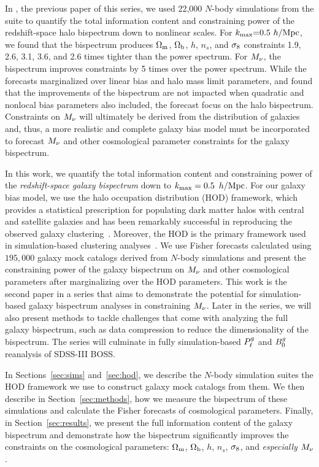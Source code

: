 In \cite{hahn2020}, the previous paper of this series, we used 22,000 $N$-body
simulations from the \quij suite to quantify the total information content and
constraining power of the redshift-space halo bispectrum down to nonlinear scales. 
For $k_{\rm max}{=}0.5~h/{\rm Mpc}$, we found that the bispectrum produces $\Omega_{\rm m}$,
$\Omega_{\rm b}$, $h$, $n_s$, and $\sigma_8$ constraints 1.9, 2.6, 3.1, 3.6, and 2.6 times
tighter than the power spectrum. For $M_\nu$, the bispectrum improves
constraints by 5 times over the power spectrum. While the forecasts marginalized 
over linear bias and halo mass limit parameters, and found that the
improvements of the bispectrum are not impacted when quadratic and nonlocal
bias parameters also included, the \cite{hahn2020} forecast focus on the halo
bispectrum. Constraints on $M_\nu$ will ultimately be derived from the distribution 
of galaxies and, thus, a more realistic and complete galaxy bias model must be
incorporated to forecast $M_\nu$ and other cosmological parameter constraints 
for the galaxy bispectrum.

In this work, we quantify the total information content and constraining power
of the {\em redshift-space galaxy bispectrum} down to $k_{\rm max}= 0.5~\,h/\mathrm{Mpc}$. For our galaxy
bias model, we use the halo occupation distribution (HOD) framework, which provides a
statistical prescription for populating dark matter halos with central and satellite
galaxies and has been remarkably successful in reproducing the observed galaxy
clustering~\citep[\emph{e.g.}][]{zheng2005, leauthaud2012, tinker2013, zentner2016, vakili2019}. 
Moreover, the HOD is the primary framework used in simulation-based clustering
analyses~\citep[\eg][]{mcclintock2018, zhai2019, lange2019, wibking2019}. 
We use Fisher forecasts calculated using $195,000$ galaxy mock catalogs derived
from $N$-body simulations and present the constraining power of the galaxy
bispectrum on $M_\nu$ and other cosmological parameters after marginalizing 
over the HOD parameters. This work is the second paper in a series that aims 
to demonstrate the potential for simulation-based galaxy bispectrum analyses 
in constraining $M_\nu$. Later in the series, we will also present methods to
tackle challenges that come with analyzing the full galaxy bispectrum, such 
as data compression to reduce the dimensionality of the bispectrum. The series 
will culminate in fully simulation-based $P^g_{\ell}$ and $B^g_0$ reanalysis of SDSS-III BOSS. 

In Sections~\ref{sec:sims} and~\ref{sec:hod}, we describe the \quij $N$-body simulation 
suites the HOD framework we use to construct galaxy mock catalogs from them. We then 
describe in Section~\ref{sec:methods}, how we measure the bispectrum of these
simulations and calculate the Fisher forecasts of cosmological parameters. Finally, in
Section~\ref{sec:results}, we present the full information content of the
galaxy bispectrum and demonstrate how the bispectrum significantly improves 
the constraints on the cosmological parameters: $\Omega_{\rm m}$, $\Omega_{\rm b}$, $h$, $n_s$, $\sigma_8$, and {\em especially} $M_\nu$. 
